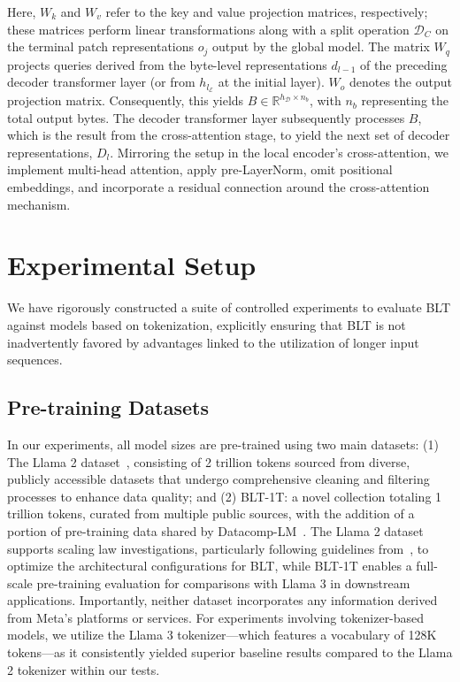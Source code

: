Here, $W_k$ and $W_v$ refer to the key and value projection matrices, respectively; these matrices perform linear transformations along with a split operation $\mathcal{D}_C$ on the terminal patch representations $o_j$ output by the global model. The matrix $W_q$ projects queries derived from the byte-level representations $d_{l-1}$ of the preceding decoder transformer layer (or from $h_{l_{\mathcal{E}}}$ at the initial layer). $W_o$ denotes the output projection matrix. Consequently, this yields $B \in \mathbb{R}^{h_{\mathcal{D}} \times n_b}$, with $n_b$ representing the total output bytes. The decoder transformer layer subsequently processes $B$, which is the result from the cross-attention stage, to yield the next set of decoder representations, $D_l$. Mirroring the setup in the local encoder's cross-attention, we implement multi-head attention, apply pre-LayerNorm, omit positional embeddings, and incorporate a residual connection around the cross-attention mechanism.

\section{Experimental Setup}
\label{section:experiments}
We have rigorously constructed a suite of controlled experiments to evaluate {\textsc BLT} against models based on tokenization, explicitly ensuring that {\textsc BLT} is not inadvertently favored by advantages linked to the utilization of longer input sequences.

\subsection{Pre-training Datasets} In our experiments, all model sizes are pre-trained using two main datasets: (1) The Llama 2 dataset~\citep{touvron2023llama}, consisting of 2 trillion tokens sourced from diverse, publicly accessible datasets that undergo comprehensive cleaning and filtering processes to enhance data quality; and (2) {\textsc BLT}-1T: a novel collection totaling 1 trillion tokens, curated from multiple public sources, with the addition of a portion of pre-training data shared by Datacomp-LM~\citep{li2024datacomp}. The Llama 2 dataset supports scaling law investigations, particularly following guidelines from~\cite{dubey2024llama}, to optimize the architectural configurations for {\textsc BLT}, while {\textsc BLT}-1T enables a full-scale pre-training evaluation for comparisons with Llama 3 in downstream applications. Importantly, neither dataset incorporates any information derived from Meta’s platforms or services. For experiments involving tokenizer-based models, we utilize the Llama 3 tokenizer—which features a vocabulary of 128K tokens—as it consistently yielded superior baseline results compared to the Llama 2 tokenizer within our tests.

